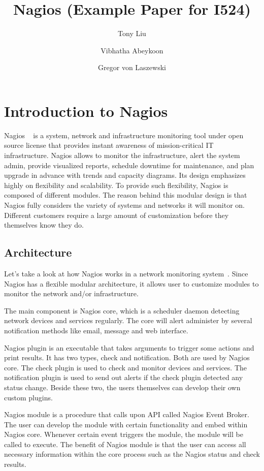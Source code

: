 \documentclass[9pt,twocolumn,twoside]{styles/osajnl}
\title{\centering%
Nagios (Example Paper for I524)}
\author[1]{Tony Liu}
\author[1]{Vibhatha Abeykoon}
\author[1]{Gregor von Laszewski}
\affil[1]{School of Informatics and Computing, Bloomington, IN 47408, U.S.A.}
\begin{document}
\maketitle

\section{Introduction to Nagios}

Nagios ~\cite{www-nagios, wiki-nagios} is a system, network and infrastructure monitoring tool under open source license that provides instant awareness of mission-critical IT infrastructure. Nagios allows to monitor the infrastructure, alert the system admin, provide visualized reports, schedule downtime for maintenance, and plan upgrade in advance with trends and capacity diagrams. Its design emphasizes highly on flexibility and scalability. To provide such flexibility, Nagios is composed of different modules. The reason behind this modular design is that Nagios fully considers the variety of systems and networks it will monitor on. Different customers require a large amount of customization before they themselves know they do.

\subsection{Architecture}

Let's take a look at how Nagios works in a network monitoring system~\cite{nagios-paper-2012}. Since Nagios has a flexible modular architecture, it allows user to customize modules to monitor the network and/or infrastructure. 

The main component is Nagios core, which is a scheduler daemon detecting network devices and services regularly. The core will alert administer by several notification methods like email, message and web interface. 

Nagios plugin is an executable that takes arguments to trigger some actions and print results. It has two types, check and notification. Both are used by Nagios core. The check plugin is used to check and monitor devices and services. The notification plugin is used to send out alerts if the check plugin detected any status change. Beside these two, the users themselves can develop their own custom plugins. 

Nagios module is a procedure that calls upon API called Nagios Event Broker. The user can develop the module with certain functionality and embed within Nagios core. Whenever certain event triggers the module, the module will be called to execute. The benefit of Nagios module is that the user can access all necessary information within the core process such as the Nagios status and check results. 
\end{document}
